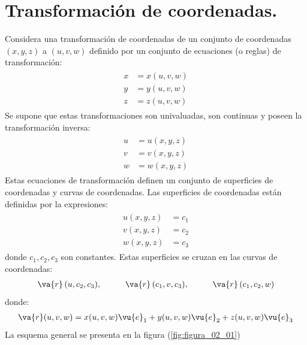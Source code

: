 \section{Transformación de coordenadas.}

Considera una transformación de coordenadas de un conjunto de coordenadas $(x, y, z)$ a $(u, v, w)$ definido por un conjunto de ecuaciones (o reglas) de transformación:
\begin{align}
\begin{aligned}
x &= x (u, v, w) \\
y &= y (u, v, w) \\
z &= z (u, v, w)
\end{aligned}
\label{eq:ecuacion_02_08}
\end{align}
Se supone que estas transformaciones son univaluadas, son continuas y poseen la transformación inversa:
\begin{align}
\begin{aligned}
u &= u (x, y, z) \\
v &= v (x, y, z) \\
w &= w (x, y, z)
\end{aligned}
\label{eq:ecuacion_02_09}
\end{align}
Estas ecuaciones de transformación definen un conjunto de superficies de coordenadas y curvas de coordenadas. Las superficies de coordenadas están definidas por la expresiones:
\begin{align}
\begin{aligned}
u (x, y, z) &= c_{1} \\
v (x, y, z) &= c_{2} \\
w (x, y, z) &= c_{3}
\end{aligned}
\label{eq:ecuacion_02_10}
\end{align}
donde $c_{1}, c_{2}, c_{3}$ son constantes. Estas superficies se cruzan en las curvas de coordenadas:
\begin{align}
\va{r} \, (u, c_{2}, c_{3}), \hspace{1cm} \va{r} \, (c_{1}, v, c_{3}), \hspace{1cm} \va{r} \, (c_{1}, c_{2}, w)
\label{eq:ecuacion_02_11}
\end{align}
donde:
\begin{align*}
\va{r} (u, v, w) = x (u, v, w) \vu{e}_{1} + y (u, v, w) \vu{e}_{2} + z (u, v, w) \vu{e}_{3}
\end{align*}
La esquema general se presenta en la figura (\ref{fig:figura_02_01})
